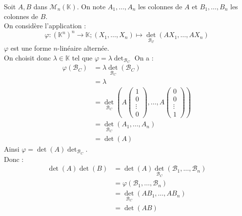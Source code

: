 \documentclass[../main.tex]{subfiles}
\begin{document}
\noindent Soit $A, B$ dans $\mathcal{M}_n(\mathbb{K})$. On note $A_1, \ldots, A_n$ les colonnes de $A$ et $B_1, \ldots, B_n$ les colonnes de $B$. \\
On considère l'application : 
$$\varphi: (\mathbb{K}^n)^n\to \mathbb{K};(X_1, \ldots, X_n)\mapsto \operatorname{det}_{\mathcal{B_C}}(AX_1, \ldots, AX_n)$$
$\varphi$ est une forme $n$-linéaire alternée. \\
On choisit donc $\lambda\in \mathbb{K}$ tel que $\varphi = \lambda \operatorname{det}_{\mathcal{B}_C}$
On a : 
\begin{align*}
    \varphi(\mathcal{B}_C) &= \lambda \operatorname{det}_{\mathcal{B}_C}(\mathcal{B}_C) \\
    &= \lambda \\
    &= \operatorname{det}_{\mathcal{B}_C} \left( A \begin{pmatrix}
        1 \\ 0 \\ \vdots \\ 0
    \end{pmatrix}, \ldots, A \begin{pmatrix}
        0 \\ 0 \\ \vdots \\ 1
    \end{pmatrix} \right) \\
    &= \operatorname{det}_{\mathcal{B}_C}(A_1, \ldots, A_n) \\
    &= \operatorname{det}(A)
\end{align*}
Ainsi $\varphi = \operatorname{det}(A) \operatorname{det}_{\mathcal{B}_C}$. \\
Donc : 
\begin{align*}
    \operatorname{det}(A) \operatorname{det}(B) &= \operatorname{det}(A) \operatorname{det}_{\mathcal{B}_C}(\mathcal{B}_1, \ldots, \mathcal{B}_n) \\
    &= \varphi(\mathcal{B}_1, \ldots, \mathcal{B}_n) \\
    &= \operatorname{det}_{\mathcal{B}_C}(AB_1, \ldots, AB_n) \\
    &= \operatorname{det} (AB)
\end{align*}

\end{document}
